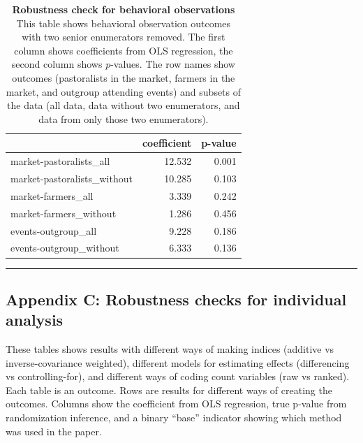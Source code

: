 \documentclass[
]{article}
\begin{document}
\begin{table}[H]
\begin{center}
\label{tab:behObs_enumsCheck_tab}
\caption{\textbf{Robustness check for behavioral observations} This table shows behavioral observation outcomes with two senior enumerators removed. The first column shows coefficients from OLS regression, the second column shows $p$-values. The row names show outcomes (pastoralists in the market, farmers in the market, and outgroup attending events) and subsets of the data (all data, data without two enumerators, and data from only those two enumerators).}
\smallskip

\begin{tabular}{l|r|r}
\hline
  & coefficient & p-value\\
\hline
market-pastoralists\_all & 12.532 & 0.001\\
\hline
market-pastoralists\_without & 10.285 & 0.103\\
\hline
market-farmers\_all & 3.339 & 0.242\\
\hline
market-farmers\_without & 1.286 & 0.456\\
\hline
events-outgroup\_all & 9.228 & 0.186\\
\hline
events-outgroup\_without & 6.333 & 0.136\\
\hline
\end{tabular}


\end{center}
\end{table}

\begin{center}\rule{0.5\linewidth}{0.5pt}\end{center}

\hypertarget{appendix-c-robustness-checks-for-individual-analysis}{%
\subsection{Appendix C: Robustness checks for individual
analysis}\label{appendix-c-robustness-checks-for-individual-analysis}}

These tables shows results with different ways of making indices
(additive vs inverse-covariance weighted), different models for
estimating effects (differencing vs controlling-for), and different ways
of coding count variables (raw vs ranked). Each table is an outcome.
Rows are results for different ways of creating the outcomes. Columns
show the coefficient from OLS regression, true p-value from
randomization inference, and a binary ``base'' indicator showing which
method was used in the paper.
\end{document}
